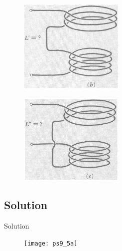 \documentclass[solutions]{esg8022pset}
\begin{document}
  \begin{figure}[H]
    \centering
    \includegraphics[width = 5cm]{pu711b}
    \label{fig:pu711b}
  \end{figure}

  \begin{figure}[H]
    \centering
    \includegraphics[width = 5cm]{pu711c}
    \label{fig:pu711c}
  \end{figure}


\subsection{Solution}
Solution
  \begin{figure}[H]
    \centering
    \texttt{[image: ps9\_5a]}
  \end{figure}
\end{document}
